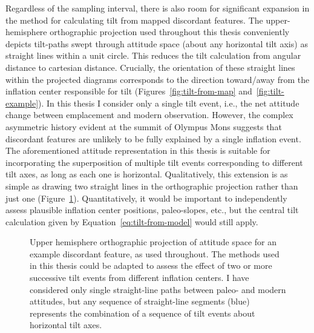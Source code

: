 Regardless of the sampling interval, there is also room for significant expansion in the method for calculating tilt from mapped discordant features. The upper-hemisphere orthographic projection used throughout this thesis conveniently depicts tilt-paths swept through attitude space (about any horizontal tilt axis) as straight lines within a unit circle. This reduces the tilt calculation from angular distance to cartesian distance. Crucially, the orientation of these straight lines within the projected diagrams corresponds to the direction toward/away from the inflation center responsible for tilt (Figures~\ref{fig:tilt-from-map} and~\ref{fig:tilt-example}). In this thesis I consider only a single tilt event, i.e., the net attitude change between emplacement and modern observation. However, the complex asymmetric history evident at the summit of Olympus Mons suggests that discordant features are unlikely to be fully explained by a single inflation event. The aforementioned attitude representation in this thesis is suitable for incorporating the superposition of multiple tilt events corresponding to different tilt axes, as long as each one is horizontal. Qualitatively, this extension is as simple as drawing two straight lines in the orthographic projection rather than just one (Figure~\ref{fig:multiple-tilt}). Quantitatively, it would be important to independently assess plausible inflation center positions, paleo-slopes, etc., but the central tilt calculation given by Equation~\eqref{eq:tilt-from-model} would still apply.

\begin{figure}
    {\caption[Multiple tilt events]{Upper hemisphere orthographic projection of attitude space for an example discordant feature, as used throughout. The methods used in this thesis could be adapted to assess the effect of two or more successive tilt events from different inflation centers. I have considered only single straight-line paths between paleo- and modern attitudes, but any sequence of straight-line segments (blue) represents the combination of a sequence of tilt events about horizontal tilt axes. 
    }\label{fig:multiple-tilt}}
    {}
\end{figure}

